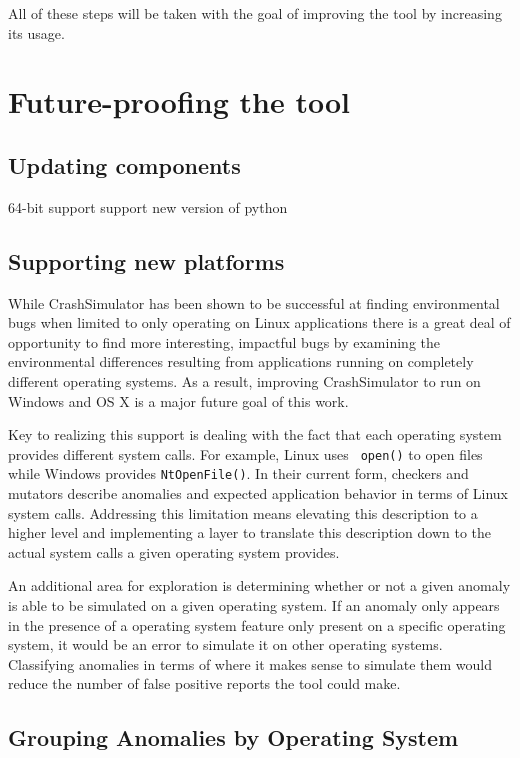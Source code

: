 \documentclass{article}
\begin{document}
All of these steps will be taken with the goal of improving the tool by
increasing its usage.

\section{Future-proofing the tool}

\subsection{Updating components}
64-bit support
support new version of python

\subsection{Supporting new platforms}

While CrashSimulator has been shown to be successful at finding
environmental bugs when limited to only operating on Linux applications
there is a great deal of opportunity to find more interesting, impactful
bugs by examining the environmental differences resulting from applications
running on completely different operating systems.  As a result, improving
CrashSimulator to run on Windows and OS X is a major future goal of this
work.

Key to realizing this support is dealing with the fact that each operating
system provides different system calls.  For example, Linux uses {\tt
open()} to open files while Windows provides {\tt NtOpenFile()}.  In their
current form, checkers and mutators describe anomalies and expected
application behavior in terms of Linux system calls.  Addressing this
limitation means elevating this description to a higher level and
implementing a layer to translate this description down to the actual
system calls a given operating system provides.

An additional area for exploration is determining whether or not a given
anomaly is able to be simulated on a given operating system.  If an anomaly
only appears in the presence of a operating system feature only present on
a specific operating system, it would be an error to simulate it on other
operating systems.  Classifying anomalies in terms of where it makes sense
to simulate them would reduce the number of false positive reports the tool
could make.

\subsection{Grouping Anomalies by Operating System}
\end{document}
